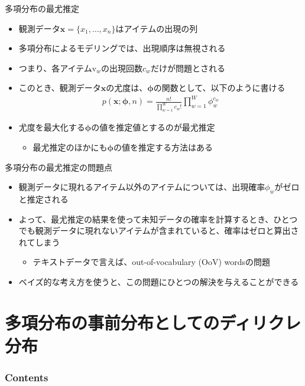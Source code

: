\documentclass[aspectratio=169,unicode,dvipdfmx,14pt]{beamer}
\begin{document}
\begin{frame}{多項分布の最尤推定}
\begin{itemize}
\item 観測データ$\bm{x}=\{x_1,\ldots,x_n\}$はアイテムの出現の列
\item 多項分布によるモデリングでは、出現順序は無視される
\item つまり、各アイテム$\mbox{v}_w$の出現回数$c_w$だけが問題とされる
\item このとき、観測データ$\bm{x}$の尤度は、$\bm{\phi}$の関数として、以下のように書ける
\begin{align}
p(\bm{x};\bm{\phi},n)=\frac{n!}{\prod_{w=1}^W c_w!}\prod_{w=1}^W\phi_w^{c_w}
\end{align}
\item 尤度を最大化する$\bm{\phi}$の値を推定値とするのが最尤推定
\begin{itemize}
\item 最尤推定のほかにも$\bm{\phi}$の値を推定する方法はある
\end{itemize}
\end{itemize}
\end{frame}

\begin{frame}{多項分布の最尤推定の問題点}
\begin{itemize}
\item 観測データに現れるアイテム以外のアイテムについては、出現確率$\phi_w$がゼロと推定される
\item よって、最尤推定の結果を使って未知データの確率を計算するとき、ひとつでも観測データに現れないアイテムが含まれていると、確率はゼロと算出されてしまう
\begin{itemize}
\item テキストデータで言えば、out-of-vocabulary (OoV) wordsの問題
\end{itemize}
\item ベイズ的な考え方を使うと、この問題にひとつの解決を与えることができる
\end{itemize}
\end{frame}


\section{多項分布の事前分布としてのディリクレ分布}

\begin{frame}\frametitle{Contents}
\Large \tableofcontents[currentsection]
\end{frame}
\end{document}
